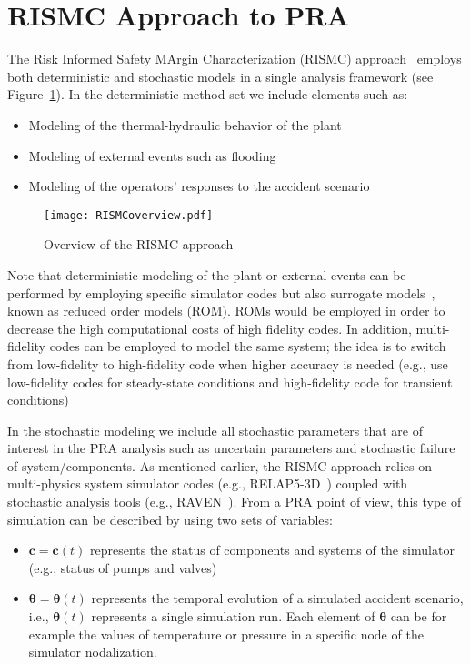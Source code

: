 \section{RISMC Approach to PRA}
\label{sec:rismc}

The Risk Informed Safety MArgin Characterization (RISMC) approach~\cite{RISMC} employs both deterministic and stochastic models 
in a single analysis framework (see Figure~\ref{fig:RISMCoverview}). In the deterministic method 
set we include elements such as:
\begin{itemize}
  \item Modeling of the thermal-hydraulic behavior of the plant~\cite{BWR_SBO_Mandelli,BWRanalysis}
  \item Modeling of external events such as flooding~\cite{mandelliPSA2015}
  \item Modeling of the operators’ responses to the accident scenario~\cite{HRA_BoringReport2014}
\end{itemize}

\begin{figure}
    \centering
    \centerline{\texttt{[image: RISMCoverview.pdf]}}
    \caption{Overview of the RISMC approach}
    \label{fig:RISMCoverview}
\end{figure}

Note that deterministic modeling of the plant or external events can be performed by employing specific 
simulator codes but also surrogate models~\cite{ROM}, known as reduced order models (ROM). ROMs would 
be employed 
in order to decrease the high computational costs of high fidelity codes. In addition, multi-fidelity codes 
can be employed to model the same system; the idea is to switch from low-fidelity to high-fidelity code 
when higher accuracy is needed (e.g., use low-fidelity codes for steady-state conditions and high-fidelity 
code for transient conditions)

In the stochastic modeling we include all stochastic parameters that are of interest in the PRA analysis 
such as uncertain parameters and stochastic failure of system/components.
As mentioned earlier, the RISMC approach relies on multi-physics system simulator codes 
(e.g., RELAP5-3D~\cite{relap5}) coupled with stochastic analysis tools (e.g., RAVEN~\cite{raven}).  
From a PRA point of view, this type of simulation can be described by using two sets of variables:
\begin{itemize}
  \item $\boldsymbol c = \boldsymbol c(t)$ represents the status of components and systems of the simulator 
        (e.g., status of pumps and valves)
  \item $\boldsymbol \theta = \boldsymbol \theta (t)$ represents the temporal evolution of a simulated 
        accident scenario, i.e., $\boldsymbol \theta (t)$ represents a single simulation run. 
        Each element of $\boldsymbol \theta$ can be for example the values of temperature or pressure in 
        a specific node of the simulator nodalization.
\end{itemize}

